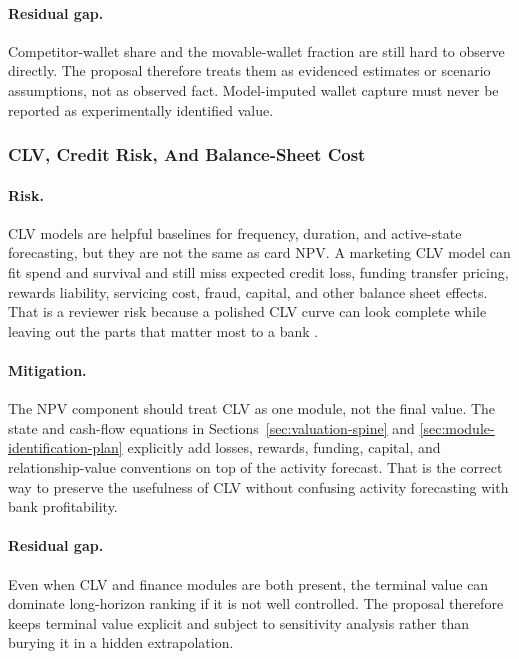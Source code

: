 \documentclass[11pt]{article}
\newcommand{\1}{\mathbf{1}}
\begin{document}
\paragraph{Residual gap.}
Competitor-wallet share and the movable-wallet fraction are still hard to
observe directly. The proposal therefore treats them as evidenced estimates or
scenario assumptions, not as observed fact. Model-imputed wallet capture must
never be reported as experimentally identified value.

\subsubsection{CLV, Credit Risk, And Balance-Sheet Cost}

\paragraph{Risk.}
CLV models are helpful baselines for frequency, duration, and active-state
forecasting, but they are not the same as card NPV. A marketing CLV model can
fit spend and survival and still miss expected credit loss, funding transfer
pricing, rewards liability, servicing cost, fraud, capital, and other balance
sheet effects. That is a reviewer risk because a polished CLV curve can look
complete while leaving out the parts that matter most to a bank
\citep{berger1998clv,rust2004return,venkatesan2004clv,schmittlein1987counting,
fader2005bgnbd,bolton1998duration}.

\paragraph{Mitigation.}
The NPV component should treat CLV as one module, not the final value. The
state and cash-flow equations in Sections~\ref{sec:valuation-spine} and
\ref{sec:module-identification-plan} explicitly add losses, rewards, funding,
capital, and relationship-value conventions on top of the activity forecast.
That is the correct way to preserve the usefulness of CLV without confusing
activity forecasting with bank profitability.

\paragraph{Residual gap.}
Even when CLV and finance modules are both present, the terminal value can
dominate long-horizon ranking if it is not well controlled. The proposal
therefore keeps terminal value explicit and subject to sensitivity analysis
rather than burying it in a hidden extrapolation.
\end{document}
